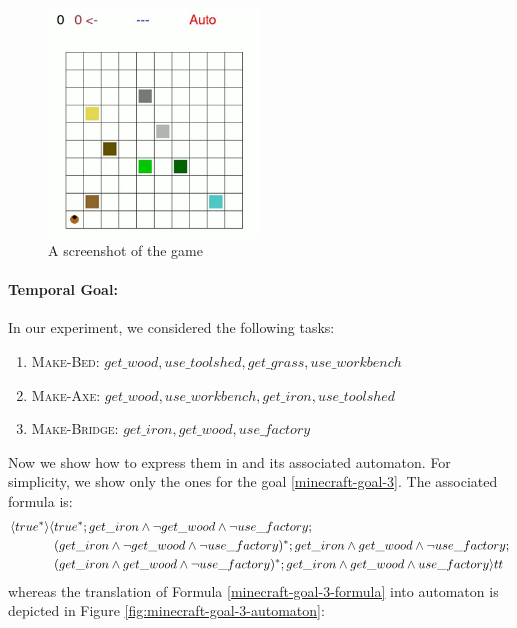\begin{figure}[h]
	\centering
	\includegraphics[width=0.5\textwidth]{images/minecraft-screenshot.png}
	\caption{A screenshot of the game \Minecraft}
	\label{fig:minecraft-screenshot}
\end{figure}

\paragraph{Temporal Goal:} In our experiment, we considered the following tasks:
\begin{enumerate}
	\item \textsc{Make-Bed}: $get\_wood, use\_toolshed, get\_grass, use\_workbench$\label{minecraft-goal-1}
	\item \textsc{Make-Axe}: $get\_wood, use\_workbench, get\_iron, use\_toolshed$\label{minecraft-goal-2}
	\item \textsc{Make-Bridge}: $get\_iron, get\_wood, use\_factory$\label{minecraft-goal-3}
\end{enumerate}
Now we show how to express them in \LDLf and its associated automaton. For simplicity, we show only the ones for the goal \ref{minecraft-goal-3}.
The associated \LDLf formula is:
\begin{align}\label{minecraft-goal-3-formula}
\langle true^* \rangle
\langle &true^*;get\_iron \wedge \lnot get\_wood \wedge \lnot use\_factory;\nonumber\\
	&
	(get\_iron \wedge \lnot get\_wood \wedge \lnot use\_factory)^*;
	get\_iron \wedge get\_wood \wedge \lnot use\_factory;\nonumber\\
	&(get\_iron \wedge  get\_wood \wedge\lnot use\_factory)^*;
	get\_iron \wedge  get\_wood \wedge  use\_factory \rangle tt
\end{align}
whereas the translation of Formula \ref{minecraft-goal-3-formula} into automaton is depicted in Figure \ref{fig:minecraft-goal-3-automaton}:

